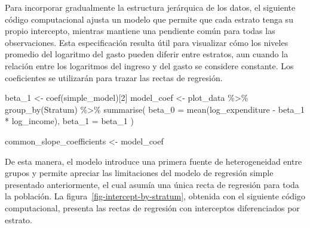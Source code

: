 \documentclass[
  spanish,
  11pt,
  letterpaper,
  oneside,
  open=any]{scrbook}
\newenvironment{Shaded}{\begin{snugshade}}{\end{snugshade}}
\newcommand{\AttributeTok}[1]{\textcolor[rgb]{0.40,0.45,0.13}{#1}}
\newcommand{\DecValTok}[1]{\textcolor[rgb]{0.68,0.00,0.00}{#1}}
\newcommand{\FunctionTok}[1]{\textcolor[rgb]{0.28,0.35,0.67}{#1}}
\newcommand{\NormalTok}[1]{\textcolor[rgb]{0.00,0.23,0.31}{#1}}
\newcommand{\OtherTok}[1]{\textcolor[rgb]{0.00,0.23,0.31}{#1}}
\newcommand{\SpecialCharTok}[1]{\textcolor[rgb]{0.37,0.37,0.37}{#1}}
\begin{document}
Para incorporar gradualmente la estructura jerárquica de los datos, el
siguiente código computacional ajusta un modelo que permite que cada
estrato tenga su propio intercepto, mientras mantiene una pendiente
común para todas las observaciones. Esta especificación resulta útil
para visualizar cómo los niveles promedio del logaritmo del gasto pueden
diferir entre estratos, aun cuando la relación entre los logaritmos del
ingreso y del gasto se considere constante. Los coeficientes se
utilizarán para trazar las rectas de regresión.

\begin{Shaded}
\begin{Highlighting}[]
\NormalTok{beta\_1 }\OtherTok{\textless{}{-}} \FunctionTok{coef}\NormalTok{(simple\_model)[}\DecValTok{2}\NormalTok{]}
\NormalTok{model\_coef }\OtherTok{\textless{}{-}}\NormalTok{ plot\_data }\SpecialCharTok{\%\textgreater{}\%}
  \FunctionTok{group\_by}\NormalTok{(Stratum) }\SpecialCharTok{\%\textgreater{}\%}
  \FunctionTok{summarise}\NormalTok{(}
    \AttributeTok{beta\_0 =} \FunctionTok{mean}\NormalTok{(log\_expenditure }\SpecialCharTok{{-}}\NormalTok{ beta\_1 }\SpecialCharTok{*}\NormalTok{ log\_income),}
    \AttributeTok{beta\_1 =}\NormalTok{ beta\_1}
\NormalTok{  )}

\NormalTok{common\_slope\_coefficients }\OtherTok{\textless{}{-}}\NormalTok{ model\_coef}
\end{Highlighting}
\end{Shaded}

De esta manera, el modelo introduce una primera fuente de heterogeneidad
entre grupos y permite apreciar las limitaciones del modelo de regresión
simple presentado anteriormente, el cual asumía una única recta de
regresión para toda la población. La
figura~\ref{fig-intercept-by-stratum}, obtenida con el siguiente código
computacional, presenta las rectas de regresión con interceptos
diferenciados por estrato.
\end{document}
